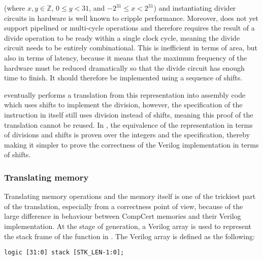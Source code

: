 (where $x, y \in \mathbb{Z}$, $0 \leq y < 31$, and $-2^{31} \leq x < 2^{31}$)
and instantiating divider circuits in hardware is well known to cripple
performance. Moreover, \vericert{} does not yet support pipelined or multi-cycle
operations and therefore requires the result of a divide operation to be ready
within a single clock cycle, meaning the divide circuit needs to be entirely
combinational. This is inefficient in terms of area, but also in terms of
latency, because it means that the maximum frequency of the hardware must be
reduced dramatically so that the divide circuit has enough time to finish.  It
should therefore be implemented using a sequence of shifts.

\compcert{} eventually performs a translation from this representation into
assembly code which uses shifts to implement the division, however, the
specification of the instruction in \rtl{} itself still uses division instead of
shifts, meaning this proof of the translation cannot be reused.  In \vericert{},
the equivalence of the representation in terms of divisions and shifts is proven
over the integers and the specification, thereby making it simpler to prove the
correctness of the Verilog implementation in terms of shifts.

\subsubsection{Translating memory}
\label{sec:hg:translating-memory}

Translating memory operations and the memory itself is one of the trickiest part
of the translation, especially from a correctness point of view, because of the
large difference in behaviour between CompCert memories and their Verilog
implementation.  At the stage of \htl{} generation, a Verilog array is used to
represent the stack frame of the function in \rtlsubpar{}.  The Verilog array is
defined as the following:

\begin{verbatim}
logic [31:0] stack [STK_LEN-1:0];
\end{verbatim}

